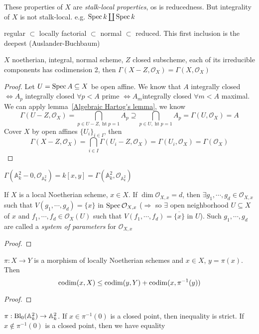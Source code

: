 \documentclass[main]{subfiles}
\begin{document}
These properties of $X$ are \textit{stalk-local properties}, os is reducedness. But integrality of $X$ is not stalk-local. e.g. $\operatorname{Spec} k\coprod\operatorname{Spec} k$

\clubsuit\quad regular $\subset$ locally factorial $\subset$ normal $\subset$ reduced. This first inclusion is the deepest (Auslander-Buchbaum)

\clubsuit\quad $X$ noetherian, integral, normal scheme, $Z$ closed subscheme, each of its irreducible components has codimension 2, then $\Gamma(X-Z,\mathcal O_X)=\Gamma(X,\mathcal O_X)$
\begin{proof}
Let $U=\operatorname{Spec} A\subseteq X$ be open affine. We know that $A$ integrally closed $\iff A_p$ integrally closed $\forall p<A$ prime $\iff A_m$integrally closed $\forall m<A$ maximal. We can apply lemma~\ref{Algebraic Hartog's lemma}, we know
\[
\Gamma(U-Z,\mathcal O_X)=\bigcap_{p\in U-Z,\operatorname{ht}p=1}A_p\supseteq\bigcap_{p\in U,\operatorname{ht}p=1}A_p=\Gamma(U,\mathcal O_X)=A
\]
Cover $X$ by open affines $\{U_i\}_{i\in I}$, then
\[
\Gamma(X-Z,\mathcal O_X)=\bigcap_{i\in I}\Gamma(U_i-Z,\mathcal O_X)=\Gamma(U_i,\mathcal O_X)=\Gamma(\mathcal O_X)
\]
\end{proof}

\begin{example}
$\Gamma(\mathbb A_k^2-0,\mathcal O_{\mathbb A^2_k})=k[x,y]=\Gamma(\mathbb A^2_k,\mathcal O_{\mathbb A^2_k})$
\end{example}

\clubsuit\quad If $X$ is a local Noetherian scheme, $x\in X$. If $\dim\mathcal O_{X,x}=d$, then $\exists g_1,\cdots,g_d\in\mathcal O_{X,x}$ such that $V(g_1,\cdots,g_d)=\{x\}$ in $\operatorname{Spec}\mathcal O_{X,x}$ ($\Rightarrow$ so $\exists$ open neighborhood $U\subseteq X$ of $x$ and $f_1,\cdots,f_d\in\mathcal O_X(U)$ such that $V(f_1,\cdots,f_d)=\overline{\{x\}}$ in $U$). Such $g_1,\cdots,g_d$ are called a \textit{system of parameters} for $\mathcal O_{X,x}$

\begin{proof}

\end{proof}

\clubsuit\quad $\pi:X\to Y$ is a morphism of locally Noetherian schemes and $x\in X$, $y=\pi(x)$. Then
\[
\operatorname{codim}(x,X)\leq\operatorname{codim}(y,Y)+\operatorname{codim}(x,\pi^{-1}(y))
\]

\begin{proof}

\end{proof}

\begin{example}
$\pi:\operatorname{Bl}_0(\mathbb A^2_k)\to\mathbb A^2_k$. If $x\in\pi^{-1}(0)$ is a closed point, then inequality is strict. If $x\notin\pi^{-1}(0)$ is a closed point, then we have equality
\end{example}
\end{document}
